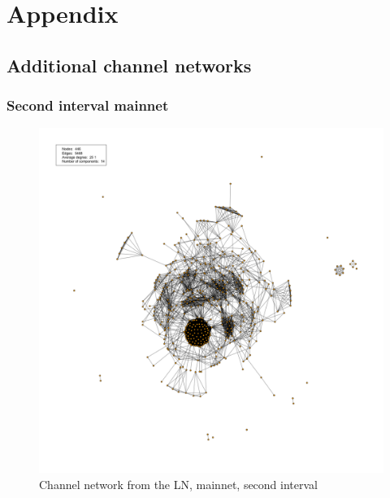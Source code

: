 \chapter{Appendix}

\section{Additional channel networks}
\label{appendix_networks}

\subsection{Second interval mainnet}

\begin{figure}[ht]
    \centering
    \includegraphics[width=14cm]{figures/graphs/cg_ln_mainnet_run2.png}
    \caption{Channel network from the LN, mainnet, second interval}
    \label{fig:channel_network_LN_mainent2}
\end{figure}

